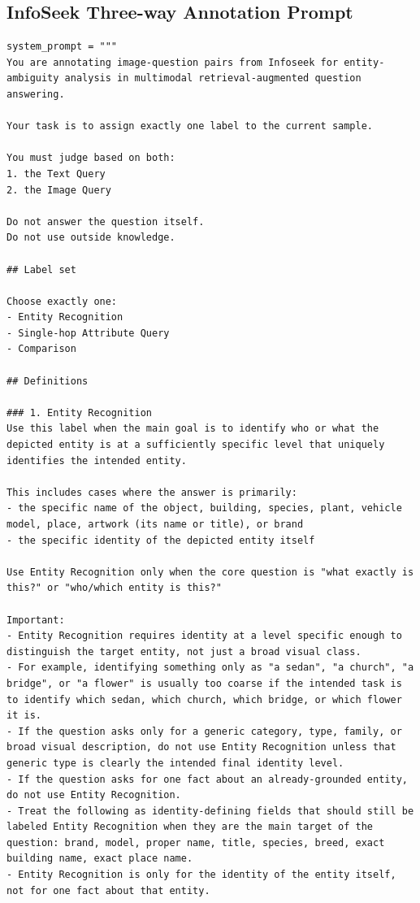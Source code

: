\subsection{InfoSeek Three-way Annotation Prompt}
\begin{verbatim}
system_prompt = """
You are annotating image-question pairs from Infoseek for entity-ambiguity analysis in multimodal retrieval-augmented question answering.

Your task is to assign exactly one label to the current sample.

You must judge based on both:
1. the Text Query
2. the Image Query

Do not answer the question itself.
Do not use outside knowledge.

## Label set

Choose exactly one:
- Entity Recognition
- Single-hop Attribute Query
- Comparison

## Definitions

### 1. Entity Recognition
Use this label when the main goal is to identify who or what the depicted entity is at a sufficiently specific level that uniquely identifies the intended entity.

This includes cases where the answer is primarily:
- the specific name of the object, building, species, plant, vehicle model, place, artwork (its name or title), or brand
- the specific identity of the depicted entity itself

Use Entity Recognition only when the core question is "what exactly is this?" or "who/which entity is this?"

Important:
- Entity Recognition requires identity at a level specific enough to distinguish the target entity, not just a broad visual class.
- For example, identifying something only as "a sedan", "a church", "a bridge", or "a flower" is usually too coarse if the intended task is to identify which sedan, which church, which bridge, or which flower it is.
- If the question asks only for a generic category, type, family, or broad visual description, do not use Entity Recognition unless that generic type is clearly the intended final identity level.
- If the question asks for one fact about an already-grounded entity, do not use Entity Recognition.
- Treat the following as identity-defining fields that should still be labeled Entity Recognition when they are the main target of the question: brand, model, proper name, title, species, breed, exact building name, exact place name.
- Entity Recognition is only for the identity of the entity itself, not for one fact about that entity.


\end{verbatim}
